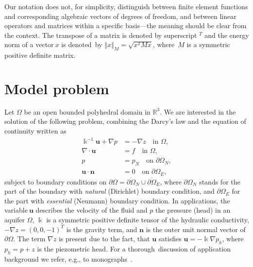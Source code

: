 Our notation does not, for simplicity, distinguish between finite element
functions and corresponding algebraic vectors of degrees of freedom, and
between linear operators and matrices within a specific basis---the meaning should be
clear from the context. The transpose of a matrix is denoted by superscript $^{T}$ and the energy
norm of a vector$~x$ is denoted\ by $\left\Vert x\right\Vert _{M}=\sqrt
{x^{T}Mx}$, where~$M$ is a symmetric positive definite matrix.

\section{Model problem}

\label{sec:model}

Let $\Omega$ be an open bounded polyhedral domain in $\mathbb{R}^{3}$. We are
interested in the solution of the following problem, combining the Darcy's law
and the equation of continuity written as
\begin{align}
\Bbbk^{-1}\mathbf{u}+\nabla p  &  =-\nabla z\quad\text{in }\Omega
,\label{eq:problem-1}\\
\nabla\cdot\mathbf{u}  &  =f\quad\text{in }\Omega,\label{eq:problem-2}\\
p  &  =p_{N}\quad\text{on }\partial\Omega_{N},\label{eq:problem-3}\\
\mathbf{u}\cdot\mathbf{n}  &  =0\quad\text{on }\partial\Omega_{E},
\label{eq:problem-4}%
\end{align}
subject to boundary conditions on $\partial\Omega=\overline{\partial\Omega
}_{N}\cup\overline{\partial\Omega}_{E}$, where $\partial\Omega_{N}$ stands for
the part of the boundary with \emph{natural} (Dirichlet) boundary condition,
and $\partial\Omega_{E}$ for the part with \emph{essential} (Neumann) boundary
condition. In applications, the variable$~\mathbf{u}$ describes the velocity
of the fluid and $p$ the pressure (head) in an aquifer $\Omega$, $\Bbbk$ is a
symmetric positive definite tensor of the hydraulic conductivity, $-\nabla
z=(0,0,-1)^{T}$ is the gravity term, and $\mathbf{n}$ is the outer unit normal
vector of $\partial\Omega$. The term $\nabla z$ is present due to the fact,
that $\mathbf{u}$ satisfies $\mathbf{u}=-\Bbbk\nabla p_{h}$, where $p_{h}=p+z$
is the piezometric head. For a thorough\ discussion of application background
we refer, e.g., to monographs~\cite{Bear-1988-DFP,Chen-2006-CMM}.

